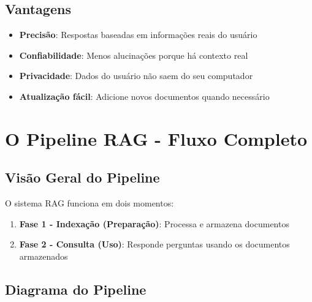 \documentclass[12pt,a4paper]{article}
\begin{document}
\subsection{Vantagens}

\begin{itemize}
    \item \textbf{Precisão}: Respostas baseadas em informações reais do usuário
    \item \textbf{Confiabilidade}: Menos alucinações porque há contexto real
    \item \textbf{Privacidade}: Dados do usuário não saem do seu computador
    \item \textbf{Atualização fácil}: Adicione novos documentos quando necessário
\end{itemize}

\section{O Pipeline RAG - Fluxo Completo}

\subsection{Visão Geral do Pipeline}

O sistema RAG funciona em dois momentos:

\begin{enumerate}
    \item \textbf{Fase 1 - Indexação (Preparação)}: Processa e armazena documentos
    \item \textbf{Fase 2 - Consulta (Uso)}: Responde perguntas usando os documentos armazenados
\end{enumerate}

\subsection{Diagrama do Pipeline}
\end{document}
